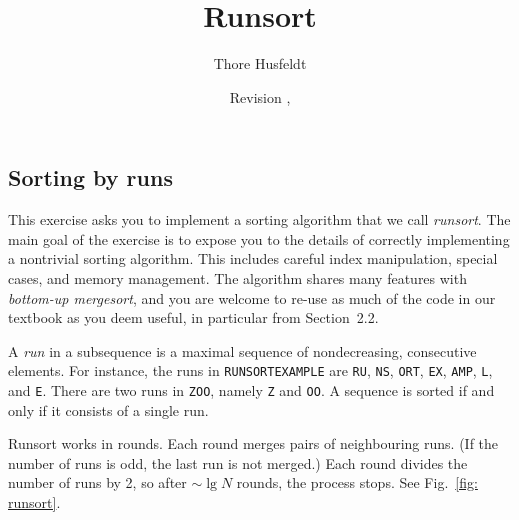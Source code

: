 \documentclass{tufte-handout}
\title{Runsort}
\author{Thore Husfeldt}
\date{\small Revision \GITAbrHash, \GITAuthorDate}
\begin{document}
\maketitle
\subsection{Sorting by runs}

This exercise asks you to implement a sorting algorithm that we call \emph{runsort}.
The main goal of the exercise is to expose you to the details of correctly implementing a nontrivial sorting algorithm.
This includes careful index manipulation, special cases, and memory management.
The algorithm shares many features with \emph{bottom-up mergesort}, and you are welcome to re-use as much of the code in our textbook as you deem useful, in particular from Section~2.2.

\medskip
A \emph{run} in a subsequence is a maximal sequence of nondecreasing, consecutive elements.
For instance, the runs in  \texttt{RUNSORTEXAMPLE} are \texttt{RU}, \texttt{NS}, \texttt{ORT}, \texttt{EX}, \texttt{AMP}, \texttt{L}, and \texttt{E}.
There are two runs in \texttt{ZOO}, namely \texttt{Z} and \texttt{OO}.
A sequence is sorted if and only if it consists of a single run.

Runsort works in rounds.
Each round merges pairs of neighbouring runs.
(If the number of runs is odd, the last run is not merged.)
Each round divides the number of runs by 2, so after $\sim\!\operatorname{lg} N$ rounds, the process stops.
See Fig.~\ref{fig: runsort}.
\end{document}
